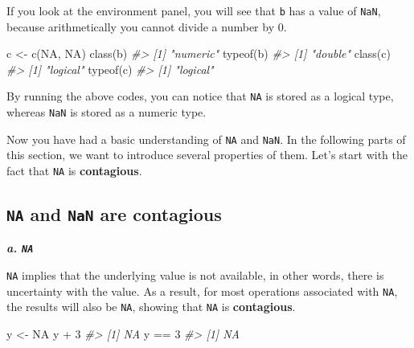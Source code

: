 \documentclass[
]{book}
\newenvironment{Shaded}{\begin{snugshade}}{\end{snugshade}}
\newcommand{\CommentTok}[1]{\textcolor[rgb]{0.56,0.35,0.01}{\textit{#1}}}
\newcommand{\ConstantTok}[1]{\textcolor[rgb]{0.00,0.00,0.00}{#1}}
\newcommand{\DecValTok}[1]{\textcolor[rgb]{0.00,0.00,0.81}{#1}}
\newcommand{\FunctionTok}[1]{\textcolor[rgb]{0.00,0.00,0.00}{#1}}
\newcommand{\NormalTok}[1]{#1}
\newcommand{\OtherTok}[1]{\textcolor[rgb]{0.56,0.35,0.01}{#1}}
\newcommand{\SpecialCharTok}[1]{\textcolor[rgb]{0.00,0.00,0.00}{#1}}
\begin{document}
If you look at the environment panel, you will see that \texttt{b} has a value of \texttt{NaN}, because arithmetically you cannot divide a number by 0.

\begin{Shaded}
\begin{Highlighting}[]
\NormalTok{c }\OtherTok{\textless{}{-}} \FunctionTok{c}\NormalTok{(}\ConstantTok{NA}\NormalTok{, }\ConstantTok{NA}\NormalTok{)}
\FunctionTok{class}\NormalTok{(b)}
\CommentTok{\#\textgreater{} [1] "numeric"}
\FunctionTok{typeof}\NormalTok{(b)}
\CommentTok{\#\textgreater{} [1] "double"}
\FunctionTok{class}\NormalTok{(c)}
\CommentTok{\#\textgreater{} [1] "logical"}
\FunctionTok{typeof}\NormalTok{(c)}
\CommentTok{\#\textgreater{} [1] "logical"}
\end{Highlighting}
\end{Shaded}

By running the above codes, you can notice that \texttt{NA} is stored as a logical type, whereas \texttt{NaN} is stored as a numeric type.

Now you have had a basic understanding of \texttt{NA} and \texttt{NaN}. In the following parts of this section, we want to introduce several properties of them. Let's start with the fact that \texttt{NA} is \textbf{contagious}.

\hypertarget{na-and-nan-are-contagious}{%
\subsection{\texorpdfstring{\texttt{NA} and \texttt{NaN} are contagious}{NA and NaN are contagious}}\label{na-and-nan-are-contagious}}

\textbf{\emph{a. \texttt{NA} }}

\texttt{NA} implies that the underlying value is not available, in other words, there is uncertainty with the value. As a result, for most operations associated with \texttt{NA}, the results will also be \texttt{NA}, showing that \texttt{NA} is \textbf{contagious}.

\begin{Shaded}
\begin{Highlighting}[]
\NormalTok{y }\OtherTok{\textless{}{-}} \ConstantTok{NA}
\NormalTok{y }\SpecialCharTok{+} \DecValTok{3}
\CommentTok{\#\textgreater{} [1] NA}
\NormalTok{y }\SpecialCharTok{==} \DecValTok{3}
\CommentTok{\#\textgreater{} [1] NA}
\end{Highlighting}
\end{Shaded}
\end{document}
